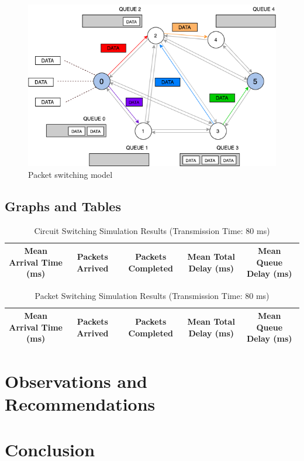 \documentclass{article}
\begin{document}
      \begin{figure}[h]
  \centering
          \includegraphics[totalheight=8cm]{images/graph_ps.png}
  \renewcommand\figurename{Figure}
      \caption{Packet switching model}
      \label{fig:graph_ps}
  \end{figure}
  

  \subsection{Graphs and Tables}

  \begin{table}[h]
    \caption{Circuit Switching Simulation Results (Transmission Time: 80 ms)}
    \centering
    {\footnotesize
      \begin{tabular}{|c|c|c|c|c|}
        \hline
          Mean Arrival Time (ms) & Packets Arrived & Packets Completed & Mean Total Delay (ms)
          & Mean Queue Delay (ms)\\
        \hline
      \end{tabular}
    }
  \end{table}

  \begin{table}[h]
    \caption{Packet Switching Simulation Results (Transmission Time: 80 ms)}
    \centering
    {\footnotesize
      \begin{tabular}{|c|c|c|c|c|}
        \hline
          Mean Arrival Time (ms) & Packets Arrived & Packets Completed & Mean Total Delay (ms)
          & Mean Queue Delay (ms)\\
        \hline
      \end{tabular}
    }
  \end{table}

  \section{Observations and Recommendations}



  \section{Conclusion}
\end{document}
